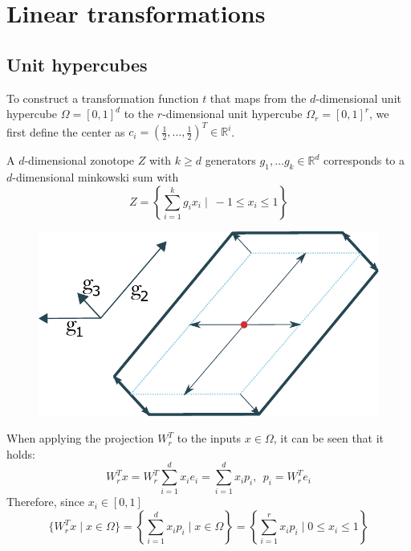 \documentclass[
  a4paper,  %
  twoside,  %
  bibliography=totoc,
  headsepline,
  cleardoublepage=empty,
  parskip=half,
  draft=false
]{scrbook}
\begin{document}
\chapter{Linear transformations}

\section{Unit hypercubes}

To construct a transformation function $t$ that maps from the $d$-dimensional unit hypercube $\Omega=[0,1]^d$ to the $r$-dimensional unit hypercube $\Omega_r=[0,1]^r$, we first define the center  as $c_i=(\frac{1}{2}, \dots, \frac{1}{2})^T\in \mathbb{R}^i$.

\begin{definition}[Zonotopes]

A $d$-dimensional zonotope $Z$ with $k \geq d$ generators $g_1, \dots g_k \in \mathds{R}^d$ corresponds to a $d$-dimensional minkowski sum with 
\begin{equation}
Z=\left\{\sum_{i=1}^k g_i x_i \mid ~ -1 \leq x_i \leq 1\right\}
  \label{zonotope}
\end{equation}

\begin{figure}[H]
\centering
  \includegraphics[width=0.5\linewidth]{graphics/zonotope}
  \label{fig:zonotope}
\end{figure}

\end{definition}

When applying the projection $W_r^T$ to the inputs $x \in \Omega$, it can be seen that it holds:
\begin{equation}
W_r^T x=W_r^T \sum_{i=1}^d x_i e_i =\sum_{i=1}^d x_i p_i , ~~ p_i=W_r^T e_i
\end{equation}
Therefore, since $x_i \in [0,1]$
\begin{equation}
\{W_r^T x \mid x \in \Omega\}=\left\{\sum_{i=1}^d x_i p_i \mid x \in \Omega \right\}=\left\{ \sum_{i=1}^r x_i p_i \mid 0 \leq x_i \leq 1\right\}
\end{equation}
\end{document}
